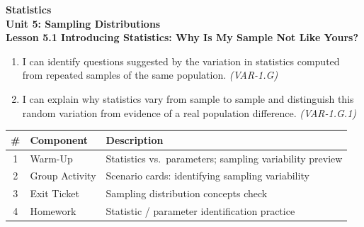 \documentclass[10pt]{article}
\begin{document}
\vspace{-0.8in}

\begin{center}
  {\color{white}\textbf{\LARGE Statistics}}\\[4pt]
  {\color{skymid}\large\textbf{Unit 5: Sampling Distributions}}\\[6pt]
  {\color{white}\textbf{\large Lesson 5.1 \quad Introducing Statistics: Why Is My Sample Not Like Yours?}}
\end{center}

\vspace{0.22in}
\namedateperiod
\vspace{0.18in}

\begin{learningtargetbox}
\small
\begin{enumerate}[leftmargin=1.5em, itemsep=5pt]
  \item I can identify questions suggested by the variation in statistics computed
        from repeated samples of the same population. \textit{(VAR-1.G)}
  \item I can explain why statistics vary from sample to sample and distinguish
        this random variation from evidence of a real population difference.
        \textit{(VAR-1.G.1)}
\end{enumerate}
\end{learningtargetbox}

\vspace{0.14in}

\begin{tocbox}
\small
\renewcommand{\arraystretch}{1.5}
\begin{tabularx}{\linewidth}{@{} c l X @{}}
\rowcolor{sky}
\textbf{\#} & \textbf{Component} & \textbf{Description} \\
\midrule
1 & Warm-Up        & Statistics vs.\ parameters; sampling variability preview \\
2 & Group Activity & Scenario cards: identifying sampling variability \\
3 & Exit Ticket    & Sampling distribution concepts check \\
4 & Homework       & Statistic / parameter identification practice \\
\end{tabularx}
\end{tocbox}
\end{document}
